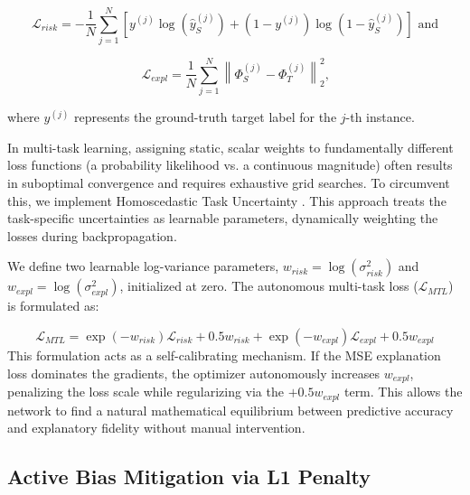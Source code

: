\documentclass{wscpaperproc}
\theoremstyle{wsc}
\begin{document}
\begin{equation*} %
    \mathcal{L}_{risk} = -\frac{1}{N}\sum_{j=1}^{N} \left[ y^{(j)} \log(\hat{y}_{S}^{(j)}) + (1-y^{(j)}) \log(1-\hat{y}_{S}^{(j)}) \right]\text{ and}
\end{equation*}

\begin{equation*} %
    \mathcal{L}_{expl} = \frac{1}{N}\sum_{j=1}^{N} \left\| \Phi_{S}^{(j)} - \Phi_{T}^{(j)} \right\|_{2}^{2}\text{,}
\end{equation*}

where $y^{(j)}$ represents the ground-truth target label for the $j$-th instance. 

In multi-task learning, assigning static, scalar weights to fundamentally different loss functions (a probability likelihood vs. a continuous magnitude) often results in suboptimal convergence and requires exhaustive grid searches. To circumvent this, we implement Homoscedastic Task Uncertainty \cite{DBLP:journals/corr/KendallGC17}. This approach treats the task-specific uncertainties as learnable parameters, dynamically weighting the losses during backpropagation. 

We define two learnable log-variance parameters, $w_{risk} = \log(\sigma_{risk}^2)$ and $w_{expl} = \log(\sigma_{expl}^2)$, initialized at zero. The autonomous multi-task loss ($\mathcal{L}_{MTL}$) is formulated as:

\begin{equation} \label{eq:mtl}
    \mathcal{L}_{MTL} = \exp(-w_{risk})\mathcal{L}_{risk} + 0.5 w_{risk} + \exp(-w_{expl})\mathcal{L}_{expl} + 0.5 w_{expl}
\end{equation}
This formulation acts as a self-calibrating mechanism. If the MSE explanation loss dominates the gradients, the optimizer autonomously increases $w_{expl}$, penalizing the loss scale while regularizing via the $+ 0.5 w_{expl}$ term. This allows the network to find a natural mathematical equilibrium between predictive accuracy and explanatory fidelity without manual intervention.

\subsection{Active Bias Mitigation via L1 Penalty}
\end{document}
